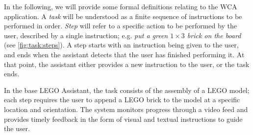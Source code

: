 \documentclass[10pt,letterpaper]{article}
\begin{document}
In the following, we will provide some formal definitions relating to the WCA application.
A \emph{task} will be understood as a finite sequence of instructions to be performed in order.
\emph{Step} will refer to a specific action to be performed by the user, described by a single instruction; e.g. \emph{put a green \(1 \times 3\) brick on the board} (see \cref{fig:task:steps}).
A step starts with an instruction being given to the user, and ends when the assistant detects that the user has finished performing it.
At that point, the assistant either provides a new instruction to the user, or the task ends.

\begin{figure*}[h]
  \centering
  \caption{Example of a Cognitive Assistance task and its component steps.}\label{fig:task:steps}
\end{figure*}




In the base LEGO Assistant, the task consists of the assembly of a LEGO model; each step requires the user to append a LEGO brick to the model at a specific location and orientation.
The system monitors progress through a video feed and provides timely feedback in the form of visual and textual instructions to guide the user. 
\end{document}
